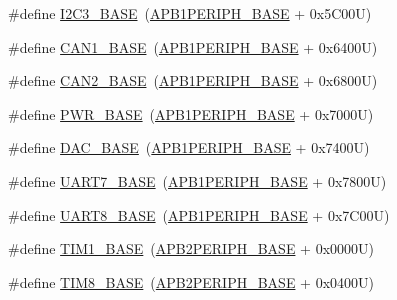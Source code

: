 \begin{DoxyCompactItemize}
\item 
\#define \hyperlink{group___peripheral__memory__map_ga4e8b9198748235a1729e1e8f8f24983b}{I2\+C3\+\_\+\+B\+A\+SE}~(\hyperlink{group___peripheral__memory__map_ga45666d911f39addd4c8c0a0ac3388cfb}{A\+P\+B1\+P\+E\+R\+I\+P\+H\+\_\+\+B\+A\+SE} + 0x5\+C00\+U)
\item 
\#define \hyperlink{group___peripheral__memory__map_gad8e45ea6c032d9fce1b0516fff9d8eaa}{C\+A\+N1\+\_\+\+B\+A\+SE}~(\hyperlink{group___peripheral__memory__map_ga45666d911f39addd4c8c0a0ac3388cfb}{A\+P\+B1\+P\+E\+R\+I\+P\+H\+\_\+\+B\+A\+SE} + 0x6400\+U)
\item 
\#define \hyperlink{group___peripheral__memory__map_gaf7b8267b0d439f8f3e82f86be4b9fba1}{C\+A\+N2\+\_\+\+B\+A\+SE}~(\hyperlink{group___peripheral__memory__map_ga45666d911f39addd4c8c0a0ac3388cfb}{A\+P\+B1\+P\+E\+R\+I\+P\+H\+\_\+\+B\+A\+SE} + 0x6800\+U)
\item 
\#define \hyperlink{group___peripheral__memory__map_gac691ec23dace8b7a649a25acb110217a}{P\+W\+R\+\_\+\+B\+A\+SE}~(\hyperlink{group___peripheral__memory__map_ga45666d911f39addd4c8c0a0ac3388cfb}{A\+P\+B1\+P\+E\+R\+I\+P\+H\+\_\+\+B\+A\+SE} + 0x7000\+U)
\item 
\#define \hyperlink{group___peripheral__memory__map_gad18d0b914c7f68cecbee1a2d23a67d38}{D\+A\+C\+\_\+\+B\+A\+SE}~(\hyperlink{group___peripheral__memory__map_ga45666d911f39addd4c8c0a0ac3388cfb}{A\+P\+B1\+P\+E\+R\+I\+P\+H\+\_\+\+B\+A\+SE} + 0x7400\+U)
\item 
\#define \hyperlink{group___peripheral__memory__map_ga3150e4b10ec876c0b20f22de12a8fa40}{U\+A\+R\+T7\+\_\+\+B\+A\+SE}~(\hyperlink{group___peripheral__memory__map_ga45666d911f39addd4c8c0a0ac3388cfb}{A\+P\+B1\+P\+E\+R\+I\+P\+H\+\_\+\+B\+A\+SE} + 0x7800\+U)
\item 
\#define \hyperlink{group___peripheral__memory__map_gac9c6cd59a248941d9d2462ab21a2346e}{U\+A\+R\+T8\+\_\+\+B\+A\+SE}~(\hyperlink{group___peripheral__memory__map_ga45666d911f39addd4c8c0a0ac3388cfb}{A\+P\+B1\+P\+E\+R\+I\+P\+H\+\_\+\+B\+A\+SE} + 0x7\+C00\+U)
\item 
\#define \hyperlink{group___peripheral__memory__map_gaf8aa324ca5011b8173ab16585ed7324a}{T\+I\+M1\+\_\+\+B\+A\+SE}~(\hyperlink{group___peripheral__memory__map_ga25b99d6065f1c8f751e78f43ade652cb}{A\+P\+B2\+P\+E\+R\+I\+P\+H\+\_\+\+B\+A\+SE} + 0x0000\+U)
\item 
\#define \hyperlink{group___peripheral__memory__map_ga5b72f698b7a048a6f9fcfe2efe5bc1db}{T\+I\+M8\+\_\+\+B\+A\+SE}~(\hyperlink{group___peripheral__memory__map_ga25b99d6065f1c8f751e78f43ade652cb}{A\+P\+B2\+P\+E\+R\+I\+P\+H\+\_\+\+B\+A\+SE} + 0x0400\+U)

\end{DoxyCompactItemize}
